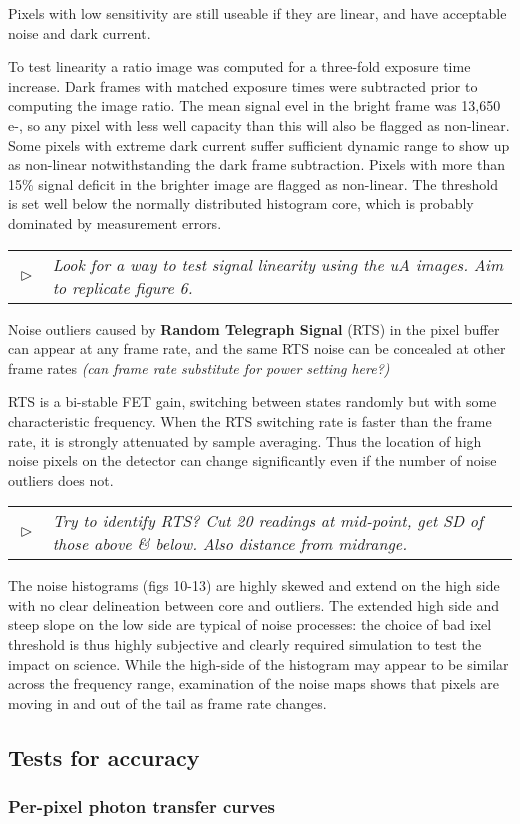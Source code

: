 \documentclass[10pt,fleqn]{article}
\renewcommand{\todo}[1]{
	\begin{minipage}{\textwidth}
	\textcolor{black}{
					\begin{tabular}{p{0.01\textwidth}p{0.95\textwidth}}
						$\vartriangleright$ & \textit{#1}
					\end{tabular}
					}
	\end{minipage}
}
\begin{document}
Pixels with low sensitivity are still useable if they are linear, and have acceptable noise and dark current.

To test linearity a ratio image was computed for a three-fold exposure time increase. Dark frames with matched exposure times were subtracted prior to computing the image ratio. The mean signal evel in the bright frame was 13,650 e-, so any pixel with less well capacity than this will also be flagged as non-linear. Some pixels with extreme dark current suffer sufficient dynamic range to show up as non-linear notwithstanding the dark frame subtraction. Pixels with more than 15\% signal deficit in the brighter image are flagged as non-linear. The threshold is set well below the normally distributed histogram core, which is probably dominated by measurement errors.

\todo{Look for a way to test signal linearity using the uA images. Aim to replicate figure 6.}

Noise outliers caused by \textbf{Random Telegraph Signal} (RTS) in the pixel buffer can appear at any frame rate, and the same RTS noise can be concealed at other frame rates \emph{(can frame rate substitute for power setting here?)}

RTS is a bi-stable FET gain, switching between states randomly but with some characteristic frequency. When the RTS switching rate is faster than the frame rate, it is strongly attenuated by sample averaging. Thus the location of high noise pixels on the detector can change significantly even if the number of noise outliers does not.

\todo{Try to identify RTS? Cut 20 readings at mid-point, get SD of those above \& below. Also distance from midrange.}
The noise histograms (figs 10-13) are highly skewed and extend on the high side with no clear delineation between core and outliers. The extended high side and steep slope on the low side are typical of noise processes: the choice of bad ixel threshold is thus highly subjective and clearly required simulation to test the impact on science. While the high-side of the histogram may appear to be similar across the frequency range, examination of the noise maps shows that pixels are moving in and out of the tail as frame rate changes.  

\subsection{Tests for accuracy}
\subsubsection{Per-pixel photon transfer curves}
\end{document}
